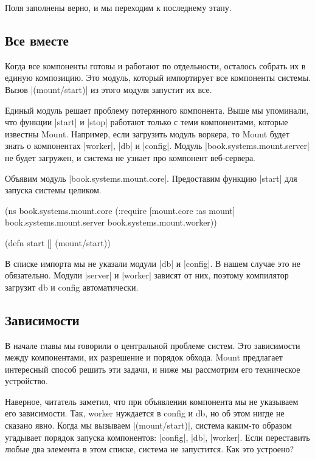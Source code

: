 Поля заполнены верно, и мы переходим к последнему этапу.

\subsection{Все вместе}

Когда все компоненты готовы и работают по отдельности, осталось собрать их в
единую композицию. Это модуль, который импортирует все компоненты системы. Вызов
\spverb|(mount/start)| из этого модуля запустит их все.

Единый модуль решает проблему потерянного компонента. Выше мы упоминали, что
функции \spverb|start| и \spverb|stop| работают только с теми компонентами, которые известны
Mount. Например, если загрузить модуль воркера, то Mount будет знать о
компонентах \spverb|worker|, \spverb|db| и \spverb|config|. Модуль \spverb|book.systems.mount.server| не
будет загружен, и система не узнает про компонент веб-сервера.

Объявим модуль \spverb|book.systems.mount.core|. Предоставим функцию \spverb|start| для
запуска системы целиком.

\begin{code}
(ns book.systems.mount.core
  (:require
   [mount.core :as mount]
   book.systems.mount.server
   book.systems.mount.worker))

(defn start []
  (mount/start))
\end{code}

В списке импорта мы не указали модули \spverb|db| и \spverb|config|. В нашем случае это не
обязательно. Модули \spverb|server| и \spverb|worker| зависят от них, поэтому компилятор
загрузит db и config автоматически.

\subsection{Зависимости}

В начале главы мы говорили о центральной проблеме систем. Это зависимости между
компонентами, их разрешение и порядок обхода. Mount предлагает интересный способ
решить эти задачи, и ниже мы рассмотрим его техническое устройство.

Наверное, читатель заметил, что при объявлении компонента мы не указываем его
зависимости. Так, worker нуждается в config и db, но об этом нигде не сказано
явно. Когда мы вызываем \spverb|(mount/start)|, система каким-то образом угадывает
порядок запуска компонентов: \spverb|config|, \spverb|db|, \spverb|worker|. Если переставить любые
два элемента в этом списке, система не запустится. Как это устроено?

